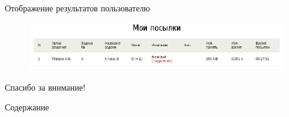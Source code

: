\documentclass[xetex,mathserif,serif,10pt]{beamer}
\begin{document}
    \begin{frame}{Отображение результатов пользователю}
        \begin{figure}
            \centering
            \includegraphics[width=\columnwidth]{rs/mysubmitsok}
        \end{figure}
    \end{frame}

    \begin{frame}
        \Large\centering Спасибо за внимание!
    \end{frame}

    \begin{frame}{Содержание}
        \tableofcontents
    \end{frame}
\end{document}
